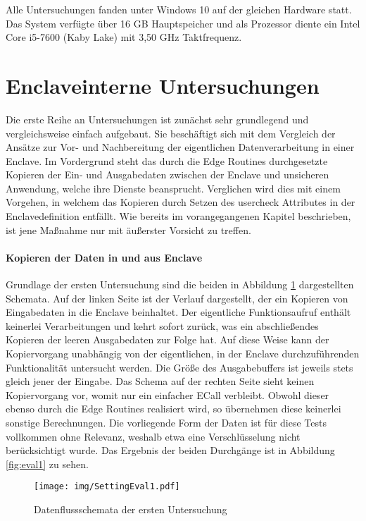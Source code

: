 Alle Untersuchungen fanden unter Windows 10 auf der gleichen Hardware statt. Das System verfügte über 16 GB Hauptspeicher und als Prozessor diente ein Intel Core i5-7600 (Kaby Lake) mit 3,50 GHz Taktfrequenz.

\section{Enclaveinterne Untersuchungen}

Die erste Reihe an Untersuchungen ist zunächst sehr grundlegend und vergleichsweise einfach aufgebaut. Sie beschäftigt sich mit dem Vergleich der Ansätze zur Vor- und Nachbereitung der eigentlichen Datenverarbeitung in einer Enclave. Im Vordergrund steht das durch die Edge Routines durchgesetzte Kopieren der Ein- und Ausgabedaten zwischen der Enclave und unsicheren Anwendung, welche ihre Dienste beansprucht. Verglichen wird dies mit einem Vorgehen, in welchem das Kopieren durch Setzen des user\textunderscore check Attributes in der Enclavedefinition entfällt. Wie bereits im vorangegangenen Kapitel beschrieben, ist jene Maßnahme nur mit äußerster Vorsicht zu treffen.

\paragraph{Kopieren der Daten in und aus Enclave}

Grundlage der ersten Untersuchung sind die beiden in Abbildung \ref{fig:settingeval1} dargestellten Schemata. Auf der linken Seite ist der Verlauf dargestellt, der ein Kopieren von Eingabedaten in die Enclave beinhaltet. Der eigentliche Funktionsaufruf enthält keinerlei Verarbeitungen und kehrt sofort zurück, was ein abschließendes Kopieren der leeren Ausgabedaten zur Folge hat. Auf diese Weise kann der Kopiervorgang unabhängig von der eigentlichen, in der Enclave durchzuführenden Funktionalität untersucht werden. Die Größe des Ausgabebuffers ist jeweils stets gleich jener der Eingabe. Das Schema auf der rechten Seite sieht keinen Kopiervorgang vor, womit nur ein einfacher \ac{ECall} verbleibt. Obwohl dieser ebenso durch die Edge Routines realisiert wird, so übernehmen diese keinerlei sonstige Berechnungen. Die vorliegende Form der Daten ist für diese Tests vollkommen ohne Relevanz, weshalb etwa eine Verschlüsselung nicht berücksichtigt wurde. Das Ergebnis der beiden Durchgänge ist in Abbildung \ref{fig:eval1} zu sehen.

\begin{figure}[h]
	\texttt{[image: img/SettingEval1.pdf]}
	\centering
	\caption{Datenflussschemata der ersten Untersuchung}
	\label{fig:settingeval1}
\end{figure}

